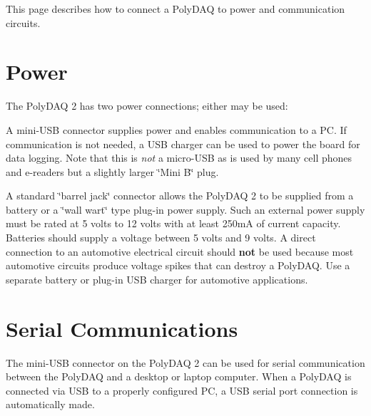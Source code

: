 This page describes how to connect a Poly\-D\-A\-Q to power and communication circuits.\hypertarget{pd_setup_pds_power}{}\section{Power}\label{pd_setup_pds_power}
The Poly\-D\-A\-Q 2 has two power connections; either may be used\-:
\begin{DoxyItemize}
\item A mini-\/\-U\-S\-B connector supplies power and enables communication to a P\-C. If communication is not needed, a U\-S\-B charger can be used to power the board for data logging. Note that this is {\itshape not} a micro-\/\-U\-S\-B as is used by many cell phones and e-\/readers but a slightly larger \char`\"{}\-Mini B\char`\"{} plug.
\item A standard \char`\"{}barrel jack\char`\"{} connector allows the Poly\-D\-A\-Q 2 to be supplied from a battery or a \char`\"{}wall wart\char`\"{} type plug-\/in power supply. Such an external power supply must be rated at 5 volts to 12 volts with at least 250m\-A of current capacity. Batteries should supply a voltage between 5 volts and 9 volts. A direct connection to an automotive electrical circuit should {\bfseries not} be used because most automotive circuits produce voltage spikes that can destroy a Poly\-D\-A\-Q. Use a separate battery or plug-\/in U\-S\-B charger for automotive applications.
\end{DoxyItemize}\hypertarget{pd_setup_pds_serial}{}\section{Serial Communications}\label{pd_setup_pds_serial}
The mini-\/\-U\-S\-B connector on the Poly\-D\-A\-Q 2 can be used for serial communication between the Poly\-D\-A\-Q and a desktop or laptop computer. When a Poly\-D\-A\-Q is connected via U\-S\-B to a properly configured P\-C, a U\-S\-B serial port connection is automatically made.
